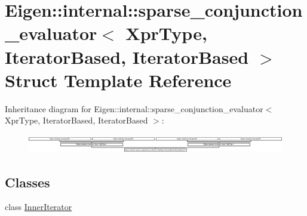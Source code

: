 \hypertarget{struct_eigen_1_1internal_1_1sparse__conjunction__evaluator_3_01_xpr_type_00_01_iterator_based_00_01_iterator_based_01_4}{}\section{Eigen\+:\+:internal\+:\+:sparse\+\_\+conjunction\+\_\+evaluator$<$ Xpr\+Type, Iterator\+Based, Iterator\+Based $>$ Struct Template Reference}
\label{struct_eigen_1_1internal_1_1sparse__conjunction__evaluator_3_01_xpr_type_00_01_iterator_based_00_01_iterator_based_01_4}
Inheritance diagram for Eigen\+:\+:internal\+:\+:sparse\+\_\+conjunction\+\_\+evaluator$<$ Xpr\+Type, Iterator\+Based, Iterator\+Based $>$\+:\begin{figure}[H]
\begin{center}
\leavevmode
\includegraphics[height=0.812379cm]{struct_eigen_1_1internal_1_1sparse__conjunction__evaluator_3_01_xpr_type_00_01_iterator_based_00_01_iterator_based_01_4}
\end{center}
\end{figure}
\subsection*{Classes}
\begin{DoxyCompactItemize}
\item 
class \hyperlink{class_eigen_1_1internal_1_1sparse__conjunction__evaluator_3_01_xpr_type_00_01_iterator_based_00_c2f169adc5f8760251f1bd99603a9afc}{Inner\+Iterator}
\end{DoxyCompactItemize}
